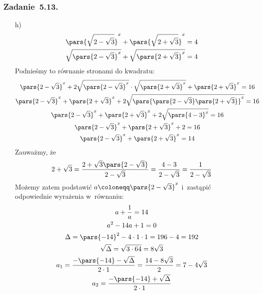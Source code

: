 \subsubsection*{Zadanie~5.13.}
\begin{itemize}
    \item[h)]
        \begin{gather*}
            \pars{\sqrt{2 - \sqrt{3}}}^x + \pars{\sqrt{2 + \sqrt{3}}}^x = 4\\
            \sqrt{\pars{2 - \sqrt{3}}^x} + \sqrt{\pars{2 + \sqrt{3}}^x} = 4
        \end{gather*}
        Podnieśmy to równanie stronami do kwadratu:
        \begin{gather*}
            \pars{2 - \sqrt{3}}^x + 2\sqrt{\pars{2 - \sqrt{3}}^x} \cdot \sqrt{\pars{2 + \sqrt{3}}^x} + \pars{2 + \sqrt{3}}^x = 16\\
            \pars{2 - \sqrt{3}}^x + \pars{2 + \sqrt{3}}^x + 2\sqrt{\pars{\pars{2 - \sqrt{3}}\pars{2 + \sqrt{3}}}^x} = 16\\
            \pars{2 - \sqrt{3}}^x + \pars{2 + \sqrt{3}}^x + 2\sqrt{\pars{4 - 3}^x} = 16\\
            \pars{2 - \sqrt{3}}^x + \pars{2 + \sqrt{3}}^x + 2 = 16\\
            \pars{2 -\sqrt{3}}^x + \pars{2 + \sqrt{3}}^x = 14
        \end{gather*}
        Zauważmy, że
        \begin{equation*}
            2 + \sqrt{3}
                = \frac{2 + \sqrt{3}\pars{2 - \sqrt{3}}}{2 - \sqrt{3}}
                = \frac{4 - 3}{2 - \sqrt{3}}
                = \frac{1}{2 - \sqrt{3}}
        \end{equation*}
        Możemy zatem podstawić \(a \coloneqq \pars{2 - \sqrt{3}}^x\) i~zastąpić odpowiednie wyrażenia w~równaniu:
        \begin{gather*}
            a + \frac{1}{a} = 14\\
            a^2 - 14a + 1 = 0\\
            \Delta
                = \pars{-14}^2 - 4 \cdot 1 \cdot 1
                = 196 - 4
                = 192\\
            \sqrt{\Delta}
                = \sqrt{3 \cdot 64}
                = 8\sqrt{3}\\
            a_1
                = \frac{-\pars{-14} - \sqrt{\Delta}}{2 \cdot 1}
                = \frac{14 - 8\sqrt{3}}{2}
                = 7 - 4\sqrt{3}\\
            a_2
                = \frac{-\pars{-14} + \sqrt{\Delta}}{2 \cdot 1}

\end{gather*}
\end{itemize}

